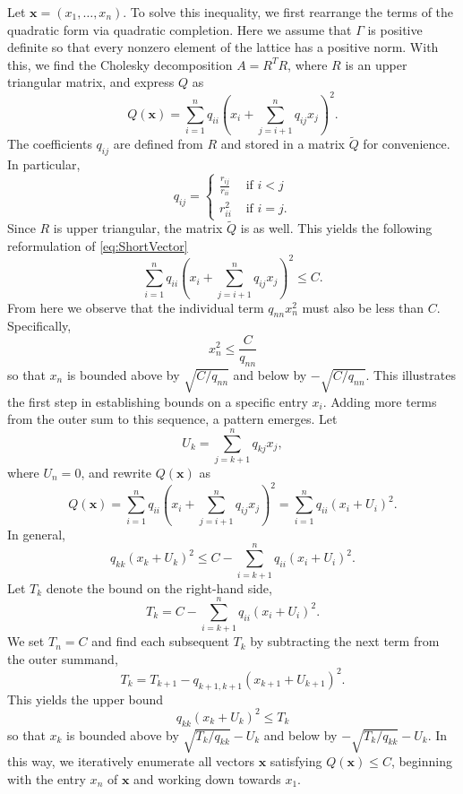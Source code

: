 Let $\mathbf{x} = (x_1, \dots, x_n)$. To solve this inequality, we first rearrange the terms of the quadratic form via quadratic completion. Here we assume that $\Gamma$ is positive definite so that every nonzero element of the lattice has a positive norm. With this, we find the Cholesky decomposition $A = R^TR$, where $R$ is an upper triangular matrix, and express $Q$ as
\[ Q(\mathbf{x}) = \sum_{i=1}^n q_{ii}\left( x_i + \sum_{j=i+1}^n q_{ij}x_j\right)^2.\]
The coefficients $q_{ij}$ are defined from $R$ and stored in a matrix $\tilde{Q}$ for convenience. In particular, 
\begin{equation} \label{eq:CholeskyCoeffs}
q_{ij} =
\begin{cases}
\frac{r_{ij}}{r_{ii}} & \text{ if } i < j\\
r_{ii}^2 & \text{ if } i = j.
\end{cases}
\end{equation}
Since $R$ is upper triangular, the matrix $\tilde{Q}$ is as well. This yields the following reformulation of \eqref{eq:ShortVector}
\[ \sum_{i=1}^n q_{ii}\left( x_i + \sum_{j=i+1}^n q_{ij}x_j\right)^2 \leq C.\]
From here we observe that the individual term $q_{nn}x_n^2$ must also be less than $C$. Specifically, 
\[x_n^2 \leq \frac{C}{q_{nn}}\]
so that $x_n$ is bounded above by $\sqrt{C/q_{nn}}$ and below by $-\sqrt{C/q_{nn}}$. This illustrates the first step in establishing bounds on a specific entry $x_i$. Adding more terms from the outer sum to this sequence, a pattern emerges. Let
\[U_k = \sum_{j = k+1}^n q_{kj}x_j,\]
where $U_n = 0$, and rewrite $Q(\mathbf{x})$ as 
\[Q(\mathbf{x}) = \sum_{i=1}^n q_{ii}\left( x_i + \sum_{j=i+1}^n q_{ij}x_j\right)^2 = \sum_{i=1}^n q_{ii}\left( x_i + U_i\right)^2.\]
In general, 
\[q_{kk}(x_k + U_k)^2 \leq C - \sum_{i = k+1}^n q_{ii}(x_i + U_i)^2.\]
Let $T_k$ denote the bound on the right-hand side, 
\[T_k = C - \sum_{i = k+1}^n q_{ii}(x_i + U_i)^2.\]
We set $T_n = C$ and find each subsequent $T_k$ by subtracting the next term from the outer summand,
\[T_k = T_{k+1} - q_{k+1,k+1}(x_{k+1} + U_{k+1})^2.\]
This yields the upper bound
\[q_{kk}(x_k + U_k)^2 \leq T_k\]
so that $x_k$ is bounded above by $\sqrt{T_k/q_{kk}} - U_k$ and below by ${-\sqrt{T_k/q_{kk}} - U_k}$. In this way, we iteratively enumerate all vectors $\mathbf{x}$ satisfying $Q(\mathbf{x}) \leq C$, beginning with the entry $x_n$ of $\mathbf{x}$ and working down towards $x_1$.  


